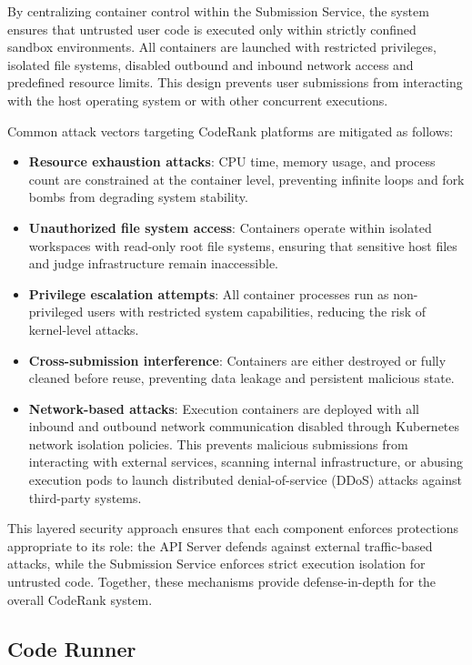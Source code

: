 By centralizing container control within the Submission Service, the system ensures that untrusted user code is executed only within strictly confined sandbox environments. All containers are launched with restricted privileges, isolated file systems, disabled outbound and inbound network access and predefined resource limits. This design prevents user submissions from interacting with the host operating system or with other concurrent executions.

Common attack vectors targeting CodeRank platforms are mitigated as follows:

\begin{itemize}
\item \textbf{Resource exhaustion attacks}: CPU time, memory usage, and process count are constrained at the container level, preventing infinite loops and fork bombs from degrading system stability.
\item \textbf{Unauthorized file system access}: Containers operate within isolated workspaces with read-only root file systems, ensuring that sensitive host files and judge infrastructure remain inaccessible.
\item \textbf{Privilege escalation attempts}: All container processes run as non-privileged users with restricted system capabilities, reducing the risk of kernel-level attacks.
\item \textbf{Cross-submission interference}: Containers are either destroyed or fully cleaned before reuse, preventing data leakage and persistent malicious state.
\item \textbf{Network-based attacks}: Execution containers are deployed with all inbound and outbound network communication disabled through Kubernetes network isolation policies. This prevents malicious submissions from interacting with external services, scanning internal infrastructure, or abusing execution pods to launch distributed denial-of-service (DDoS) attacks against third-party systems.
\end{itemize}

This layered security approach ensures that each component enforces protections appropriate to its role: the API Server defends against external traffic-based attacks, while the Submission Service enforces strict execution isolation for untrusted code. Together, these mechanisms provide defense-in-depth for the overall CodeRank system.

\subsection{Code Runner}
